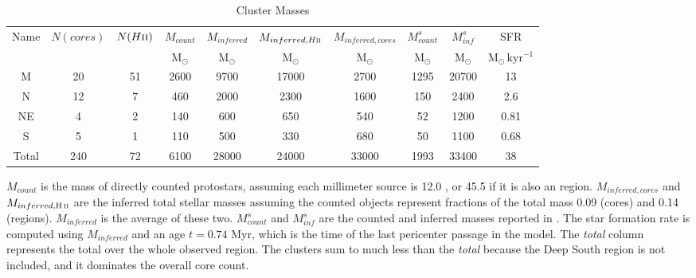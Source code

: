 \begin{table*}[htp]
\centering
\caption{Cluster Masses}
\begin{tabular}{cccccccccc}
\label{tab:clustermassestimates}
Name & $N(cores)$ & $N(H\textsc{ii})$ & $M_{count}$ & $M_{inferred}$ & $M_{inferred, H\textsc{ii}}$ & $M_{inferred, cores}$ & $M_{count}^s$ & $M_{inf}^s$ & SFR \\
 &  &  & $\mathrm{M_{\odot}}$ & $\mathrm{M_{\odot}}$ & $\mathrm{M_{\odot}}$ & $\mathrm{M_{\odot}}$ & $\mathrm{M_{\odot}}$ & $\mathrm{M_{\odot}}$ & $\mathrm{M_{\odot}\,kyr^{-1}}$ \\
\hline
M & 20 & 51 & 2600 & 9700 & 17000 & 2700 & 1295 & 20700 & 13 \\
N & 12 & 7 & 460 & 2000 & 2300 & 1600 & 150 & 2400 & 2.6 \\
NE & 4 & 2 & 140 & 600 & 650 & 540 & 52 & 1200 & 0.81 \\
S & 5 & 1 & 110 & 500 & 330 & 680 & 50 & 1100 & 0.68 \\
Total & 240 & 72 & 6100 & 28000 & 24000 & 33000 & 1993 & 33400 & 38 \\
\hline
\end{tabular}
\par
$M_{count}$ is the mass of directly counted protostars, assuming each millimeter source is 12.0 \msun, or 45.5 \msun if it is also an \hii region.  $M_{inferred,cores}$ and $M_{inferred,\hii}$ are the inferred total stellar masses assuming the counted objects represent fractions of the total mass 0.09 (cores) and 0.14 (\hii regions).  $M_{inferred}$ is the average of these two.  $M_{count}^s$ and $M_{inf}^s$ are the counted and inferred masses reported in \citet{Schmiedeke2016a}.  The star formation rate is computed using $M_{inferred}$ and an age $t=0.74$ Myr, which is the time of the last pericenter passage in the \citet{Kruijssen2015a} model.  The \emph{total} column represents the total over the whole observed region.    The clusters sum to much less than the \emph{total} because the Deep South region is not included, and it dominates the overall core count.
\end{table*}
